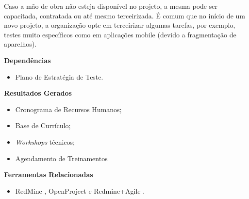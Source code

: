 Caso a mão de obra não esteja disponível no projeto, a mesma pode ser capacitada, contratada ou até mesmo terceirizada. É comum que no início de um novo projeto, a organização opte em terceirizar algumas tarefas, por exemplo, testes muito específicos como em aplicações mobile (devido a fragmentação de aparelhos).

\textbf{Dependências}
\begin{itemize}
    \item Plano de Estratégia de Teste.
\end{itemize}

\textbf{Resultados Gerados}
\begin{itemize}
    \item Cronograma de Recursos Humanos;
    \item Base de Currículo;
    \item \textit{Workshops} técnicos;
    \item Agendamento de Treinamentos
\end{itemize}

\textbf{Ferramentas Relacionadas}
\begin{itemize}
    \item RedMine \cite{Redmine}, OpenProject \cite{OpenProject} e Redmine+Agile \cite{RedmineUP}.
\end{itemize}




